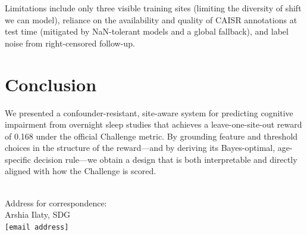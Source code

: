 \documentclass{cinc}
\begin{document}
Limitations include only three visible training sites (limiting the diversity
of shift we can model), reliance on the availability and quality of CAISR
annotations at test time (mitigated by NaN-tolerant models and a global
fallback), and label noise from right-censored follow-up.

\section{Conclusion}

We presented a confounder-resistant, site-aware system for predicting
cognitive impairment from overnight sleep studies that achieves a
leave-one-site-out reward of 0.168 under the official Challenge metric. By
grounding feature and threshold choices in the structure of the reward—and by
deriving its Bayes-optimal, age-specific decision rule—we obtain a design that
is both interpretable and directly aligned with how the Challenge is scored.




\ \\
\noindent
Address for correspondence: \\
Arshia Ilaty, SDG \\
\texttt{[email address]}
\end{document}

